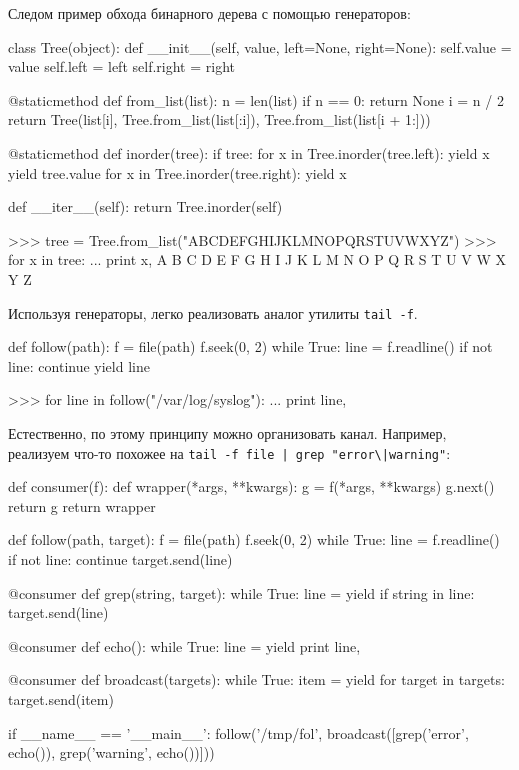Следом пример обхода бинарного дерева с помощью генераторов:
\begin{pylst}{}{}
class Tree(object):
    def __init__(self, value, left=None, right=None):
        self.value = value
        self.left  = left
        self.right = right

    @staticmethod
    def from_list(list):
        n = len(list)
        if n == 0:
            return None
        i = n / 2
        return Tree(list[i],
                    Tree.from_list(list[:i]),
                    Tree.from_list(list[i + 1:]))

    @staticmethod
    def inorder(tree):
        if tree:
            for x in Tree.inorder(tree.left):
                yield x
            yield tree.value
            for x in Tree.inorder(tree.right):
                yield x

    def __iter__(self):
        return Tree.inorder(self)

>>> tree = Tree.from_list("ABCDEFGHIJKLMNOPQRSTUVWXYZ")
>>> for x in tree:
...     print x,
A B C D E F G H I J K L M N O P Q R S T U V W X Y Z
\end{pylst}

Используя генераторы, легко реализовать аналог утилиты \lstinline{tail -f}.
\begin{pylst}{}{}
def follow(path):
    f = file(path)
    f.seek(0, 2)
    while True:
        line = f.readline()
        if not line:
            continue
        yield line

>>> for line in follow("/var/log/syslog"):
...     print line,
\end{pylst}

Естественно, по этому принципу можно организовать канал. Например, реализуем что-то похожее на \lstinline{tail -f file | grep "error\|warning"}:
\begin{pylst}{}{}
def consumer(f):
    def wrapper(*args, **kwargs):
        g = f(*args, **kwargs)
        g.next()
        return g
    return wrapper

def follow(path, target):
    f = file(path)
    f.seek(0, 2)
    while True:
         line = f.readline()
         if not line:
             continue
         target.send(line)

@consumer
def grep(string, target):
    while True:
        line = yield
        if string in line:
            target.send(line)

@consumer
def echo():
    while True:
        line = yield
        print line,

@consumer
def broadcast(targets):
    while True:
        item = yield
        for target in targets:
            target.send(item)

if __name__ == '__main__':
    follow('/tmp/fol',
           broadcast([grep('error', echo()),
                      grep('warning', echo())]))
\end{pylst}

